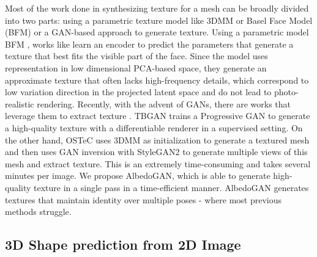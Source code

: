 \documentclass[10pt,twocolumn,letterpaper]{article}
\begin{document}
Most of the work done in synthesizing texture for a mesh can be broadly divided into two parts: using a parametric texture model like 3DMM or Basel Face Model (BFM) \cite{deca, deep3dface_recon, occlusion_robust_mofa, tewari} or a GAN-based approach \cite{Gecer_2021_CVPR, gecer2020tbgan, Gecer_2019_CVPR, fastganfit, textureGeneration, texture-completion-iccv, gecer2019ganfit, uvgan} to generate texture. 
Using a parametric model BFM \cite{bfm}, works like \cite{deca, deep3dface_recon, occlusion_robust_mofa, tewari} learn an encoder to predict the parameters that generate a texture that best fits the visible part of the face. 
Since the model uses representation in low dimensional PCA-based space, they generate an approximate texture that often lacks high-frequency details, which correspond to low variation direction in the projected latent space and do not lead to photo-realistic rendering. Recently, with the advent of GANs, there are works that leverage them to extract texture \cite{Gecer_2021_CVPR, gecer2020tbgan, texture-completion-iccv}. TBGAN \cite{gecer2020tbgan} trains a Progressive GAN to generate a high-quality texture with a differentiable renderer in a supervised setting. On the other hand, OSTeC \cite{Gecer_2021_CVPR} uses 3DMM as initialization to generate a textured mesh and then uses GAN inversion with StyleGAN2 to generate multiple views of this mesh and extract texture. This is an extremely time-consuming and takes several minutes per image. We propose AlbedoGAN, which is able to generate high-quality texture in a single pass in a time-efficient manner. AlbedoGAN generates textures that maintain identity over multiple poses - where most previous methods struggle.










\subsection{3D Shape prediction from 2D Image}
\end{document}
